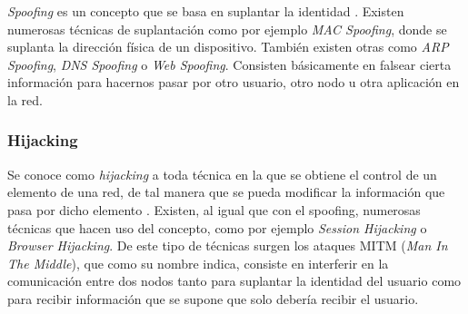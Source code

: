 \emph{Spoofing} es un concepto que se basa en suplantar la identidad \cite{ataque-en-redes-ip}. Existen numerosas técnicas de suplantación como por ejemplo \textit{MAC Spoofing}, donde se suplanta la dirección física de un dispositivo. También existen otras como \textit{ARP Spoofing}, \textit{DNS Spoofing} o \textit{Web Spoofing}. Consisten básicamente en falsear cierta información para hacernos pasar por otro usuario, otro nodo u otra aplicación en la red.

\subsubsection{Hijacking}

Se conoce como \emph{hijacking} a toda técnica en la que se obtiene el control de un elemento de una red, de tal manera que se pueda modificar la información que pasa por dicho elemento \cite{ataque-en-redes-ip}. Existen, al igual que con el spoofing, numerosas técnicas que hacen uso del concepto, como por ejemplo \textit{Session Hijacking} o \textit{Browser Hijacking}. De este tipo de técnicas surgen los ataques MITM (\textit{Man In The Middle}), que como su nombre indica, consiste en interferir en la comunicación entre dos nodos tanto para suplantar la identidad del usuario como para recibir información que se supone que solo debería recibir el usuario.